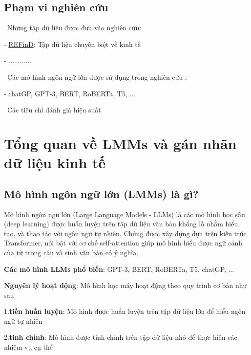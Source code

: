 \documentclass{article} %
\begin{document}
\subsection{Phạm vi nghiên cứu}

\noindent
\textbullet\ Những tập dữ liệu được đưa vào nghiên cứu: 

\hspace{10pt}- \hyperlink{ref:refind2023}{REFinD}: Tập dữ liệu chuyên biệt về kinh tế

\hspace{10pt}- ............

\noindent
\textbullet\ Các mô hình ngôn ngữ lớn được sử dụng trong nghiên cứu :

\hspace{10pt}- chatGP, GPT-3, BERT, RoBERTa, T5, ...

\noindent
\textbullet\ Các tiêu chí đánh giá hiệu suất

\section{Tổng quan về LMMs và gán nhãn dữ liệu kinh tế}

\subsection{Mô hình ngôn ngữ lớn (LMMs) là gì?}

\hspace{10pt} Mô hình ngôn ngữ lớn (Large Language Models - LLMs) là các mô hình học sâu (deep learning) được huấn luyện trên tập 
dữ liệu văn bản khổng lồ nhằm hiểu, tạo, và thao tác với ngôn ngữ tự nhiên. Chúng được xây dựng dựa trên kiến trúc Transformer, 
nổi bật với cơ chế self-attention giúp mô hình hiểu được ngữ cảnh của từ trong câu và sinh văn bản có ý nghĩa.

\hspace{10pt} \textbf{Các mô hình LLMs phổ biến}: GPT-3, BERT, RoBERTa, T5, chatGP, ...

\hspace{10pt} \textbf{Nguyên lý hoạt động}: Mô hình học máy hoạt động theo quy trình cơ bản như sau

\hspace{35pt} 1.\textbf{tiền huấn luyện}: Mô hình được huấn luyện trên tập dữ liệu lớn để hiểu ngôn ngữ tự nhiên

\hspace{35pt} 2.\textbf{tinh chỉnh}: Mô hình được tinh chỉnh trên tập dữ liệu nhỏ để thực hiện các nhiệm vụ cụ thể
\end{document}
